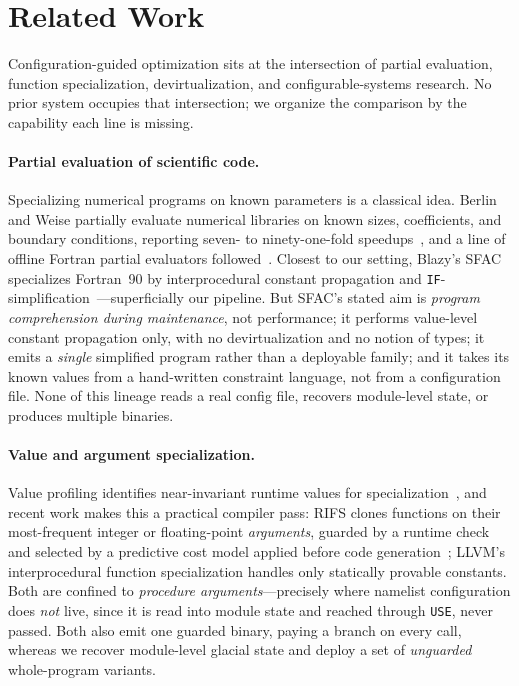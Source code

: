 \section{Related Work}
\label{sec:related}

Configuration-guided optimization sits at the intersection of partial evaluation, function specialization, devirtualization, and configurable-systems research. No prior system occupies that intersection; we organize the comparison by the capability each line is missing.

\paragraph{Partial evaluation of scientific code.}
Specializing numerical programs on known parameters is a classical idea. Berlin and Weise partially evaluate numerical libraries on known sizes, coefficients, and boundary conditions, reporting seven- to ninety-one-fold speedups~\cite{berlinweise}, and a line of offline Fortran partial evaluators followed~\cite{kleinrubatscher}. Closest to our setting, Blazy's SFAC specializes Fortran~90 by interprocedural constant propagation and \texttt{IF}-simplification~\cite{sfac}---superficially our pipeline. But SFAC's stated aim is \emph{program comprehension during maintenance}, not performance; it performs value-level constant propagation only, with no devirtualization and no notion of types; it emits a \emph{single} simplified program rather than a deployable family; and it takes its known values from a hand-written constraint language, not from a configuration file. None of this lineage reads a real config file, recovers module-level state, or produces multiple binaries.

\paragraph{Value and argument specialization.}
Value profiling identifies near-invariant runtime values for specialization~\cite{calder_valueprofiling}, and recent work makes this a practical compiler pass: RIFS clones functions on their most-frequent integer or floating-point \emph{arguments}, guarded by a runtime check and selected by a predictive cost model applied before code generation~\cite{rifs}; LLVM's interprocedural function specialization handles only statically provable constants. Both are confined to \emph{procedure arguments}---precisely where namelist configuration does \emph{not} live, since it is read into module state and reached through \texttt{USE}, never passed. Both also emit one guarded binary, paying a branch on every call, whereas we recover module-level glacial state and deploy a set of \emph{unguarded} whole-program variants.

